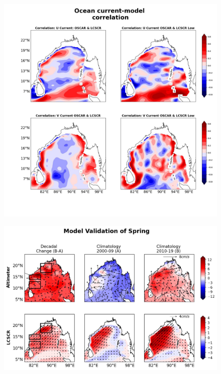 \documentclass[review]{elsarticle}
\begin{document}
\begin{figure}[!h]
	\begin{center}
		\includegraphics[width=1\textwidth]{./images/corr_curr.jpg}
		\caption {
		}
		\label{fig:paper_03}
	\end{center}
\end{figure}
\clearpage

\begin{figure}[!h]
	\begin{center}
		\includegraphics[width=1\textwidth]{./images/Spring_Mod_val.jpg}
		\caption {
		}
		\label{fig:paper_04}
	\end{center}
\end{figure}
\clearpage
\end{document}
